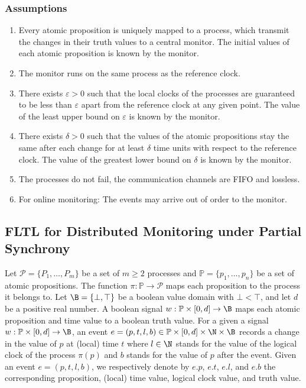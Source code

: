\subsubsection*{Assumptions}
\begin{enumerate}
	\item Every atomic proposition is uniquely mapped to a process, which transmit the changes in their truth values to a central monitor. The initial values of each atomic proposition is known by the monitor.
	\item The monitor runs on the same process as the reference clock.
	\item There exists $\varepsilon > 0$ such that the local clocks of the processes are guaranteed to be less than $\varepsilon$ apart from the reference clock at any given point. The value of the least upper bound on $\varepsilon$ is known by the monitor. %
	\item There exists $\delta > 0$ such that the values of the atomic propositions stay the same after each change for at least $\delta$ time units with respect to the reference clock. The value of the greatest lower bound on $\delta$ is known by the monitor.
	\item The processes do not fail, the communication channels are FIFO and lossless.
	\item For online monitoring: The events may arrive out of order to the monitor. 
\end{enumerate}

\subsection*{FLTL for Distributed Monitoring under Partial Synchrony}
Let $\mathcal{P} = \{P_1, \ldots, P_m\}$ be a set of $m \geq 2$ processes and $\mathbb{P} = \{p_1, \ldots, p_n\}$ be a set of atomic propositions.
The function $\pi : \mathbb{P} \to \mathcal{P}$ maps each proposition to the process it belongs to.
Let $\B = \{\bot, \top\}$ be a boolean value domain with $\bot < \top$, and let $d$ be a positive real number.
A boolean signal $w : \mathbb{P} \times [0,d] \to \B$ maps each atomic proposition and time value to a boolean truth value.
For a given a signal $w : \mathbb{P} \times [0,d] \to \B$, an event $e = (p, t, l, b) \in \mathbb{P} \times [0,d] \times \N \times \B$ records a change in the value of $p$ at (local) time $t$ where $l \in \N$ stands for the value of the logical clock of the process $\pi(p)$ and $b$ stands for the value of $p$ after the event.
Given an event $e = (p, t, l, b)$, we respectively denote by $e.p$, $e.t$, $e.l$, and $e.b$ the corresponding proposition, (local) time value, logical clock value, and truth value.

